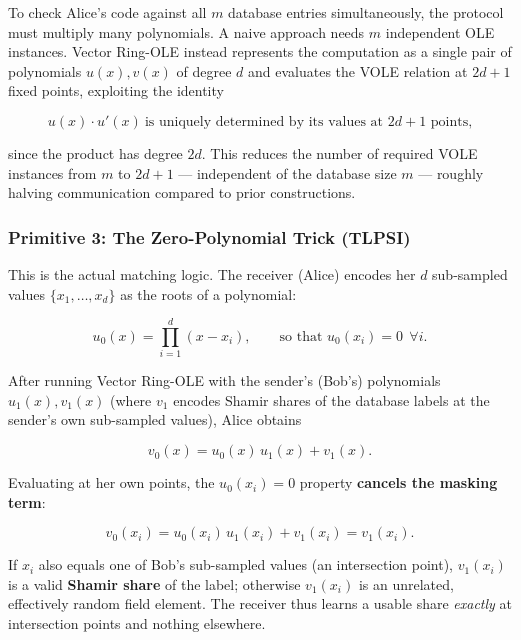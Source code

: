 \documentclass[11pt]{article}
\begin{document}
To check Alice's code against all $m$ database entries simultaneously, the protocol must
multiply many polynomials. A naive approach needs $m$ independent OLE instances. Vector
Ring-OLE instead represents the computation as a single pair of polynomials $u(x), v(x)$ of
degree $d$ and evaluates the VOLE relation at $2d+1$ fixed points, exploiting the identity

\begin{equation}
u(x)\cdot u'(x) \ \text{is uniquely determined by its values at } 2d+1 \text{ points,}
\end{equation}

since the product has degree $2d$. This reduces the number of required VOLE instances from
$m$ to $2d+1$ --- independent of the database size $m$ --- roughly halving communication
compared to prior constructions.

\subsubsection{Primitive 3: The Zero-Polynomial Trick (TLPSI)}

This is the actual matching logic. The receiver (Alice) encodes her $d$ sub-sampled values
$\{x_1,\ldots,x_d\}$ as the roots of a polynomial:

\begin{equation}
u_0(x) = \prod_{i=1}^{d} (x - x_i), \qquad \text{so that } u_0(x_i) = 0 \ \ \forall i.
\end{equation}

After running Vector Ring-OLE with the sender's (Bob's) polynomials $u_1(x), v_1(x)$ (where
$v_1$ encodes Shamir shares of the database labels at the sender's own sub-sampled values),
Alice obtains

\begin{equation}
v_0(x) = u_0(x)\,u_1(x) + v_1(x).
\end{equation}

Evaluating at her own points, the $u_0(x_i)=0$ property \textbf{cancels the masking term}:

\begin{equation}
v_0(x_i) = u_0(x_i)\,u_1(x_i) + v_1(x_i) = v_1(x_i).
\end{equation}

If $x_i$ also equals one of Bob's sub-sampled values (an intersection point), $v_1(x_i)$ is
a valid \textbf{Shamir share} of the label; otherwise $v_1(x_i)$ is an unrelated,
effectively random field element. The receiver thus learns a usable share \emph{exactly}
at intersection points and nothing elsewhere.
\end{document}
